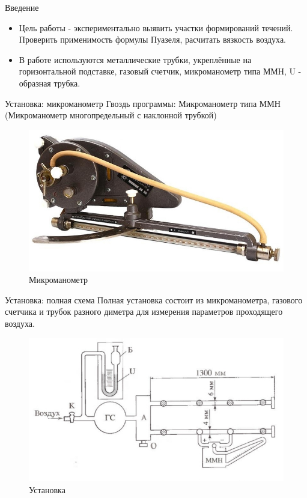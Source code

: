 
 \begin{frame}{Введение}
\begin{itemize}
    \item 
     Цель работы - экспериментально выявить участки формирований течений. Проверить применимость формулы Пуазеля, расчитать вязкость воздуха.
    \item 
     В работе используются металлические трубки, укреплённые на горизонтальной подставке, газовый счетчик, микроманометр типа ММН, U - образная трубка.
\end{itemize}
\end{frame}
\begin{frame}{Установка: микроманометр}
    Гвоздь программы: Микроманометр типа ММН (Микроманометр многопредельный с наклонной трубкой)
    \begin{figure}
        \centering
        \includegraphics[scale=0.3]{Images_viscosty/manometer.jpg}
        \caption{Микроманометр}
        \label{fig:my_label}
    \end{figure}
\end{frame} 
\begin{frame}{Установка: полная схема}
    Полная установка состоит из микроманометра, газового счетчика и трубок разного диметра для измерения параметров проходящего воздуха.
    \begin{figure}
        \centering
        \includegraphics[scale=0.3]{Images_viscosty/full.jpg}
        \caption{Установка}
        \label{fig:my_label}
    \end{figure}
\end{frame}

